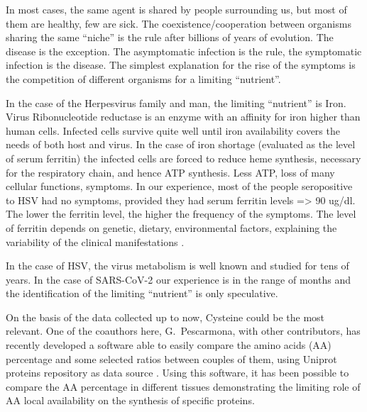 \documentclass[graybox]{svmult}
\begin{document}
In most cases, the same agent is shared by people surrounding us, but most of them are healthy, few are sick.
The coexistence/cooperation between organisms sharing the same ``niche'' is the rule after billions of years of evolution. The disease is the exception.
The asymptomatic infection is the rule, the symptomatic infection is the disease.
The simplest explanation for the rise of the symptoms is the competition of different organisms for a limiting  ``nutrient''.

In the case of the Herpesvirus family and man, the limiting “nutrient” is Iron.
Virus Ribonucleotide reductase is an enzyme with an affinity for iron higher than human cells. Infected cells survive quite well until iron availability covers the needs of both host and virus. In the case of iron shortage (evaluated as the level of serum ferritin) the infected cells are forced to reduce heme synthesis, necessary for the respiratory chain, and hence ATP synthesis. Less ATP, loss of many cellular functions, symptoms. In our experience, most of the people seropositive to HSV had no symptoms, provided they had serum ferritin levels => 90 ug/dl. The lower the ferritin level, the higher the frequency of the symptoms. The level of ferritin depends on genetic, dietary, environmental factors, explaining the variability of the clinical manifestations \cite{gennero2010iron}.

In the case of HSV, the virus metabolism is well known and studied for tens of years.
In the case of SARS-CoV-2 our experience is in the range of months and the identification of the limiting ``nutrient'' is only speculative.

On the basis of the data collected up to now, Cysteine could be the most relevant.
One of the coauthors here, G.~Pescarmona, with other contributors, has recently developed a software able to easily compare the amino acids (AA) percentage and some selected ratios between couples of them, using Uniprot proteins repository as data source \cite{vernone2013human}. Using this software, it has been possible to compare the AA percentage in different tissues \cite{vernone2019analysis} demonstrating the limiting role of AA local availability on the synthesis of specific proteins.
\end{document}
